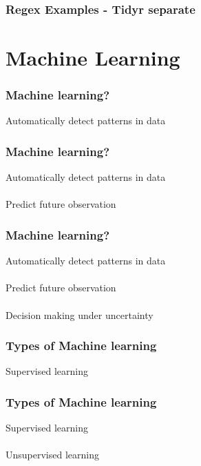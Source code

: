 \documentclass{beamer}
\begin{document}
\begin{frame}
	\frametitle{Regex Examples - Tidyr separate}
	\begin{center}
		\lstRegexIII
	\end{center}
\end{frame}

\section{Machine Learning}

\begin{frame}
	\frametitle{Machine learning?}
	\begin{center}
	Automatically detect patterns in data
	\end{center}
\end{frame}

\begin{frame}
	\frametitle{Machine learning?}
	\begin{center}
		Automatically detect patterns in data\\~\\
		Predict future observation
	\end{center}
\end{frame}

\begin{frame}
	\frametitle{Machine learning?}
	\begin{center}
		Automatically detect patterns in data\\~\\
		Predict future observation\\~\\
		Decision making under uncertainty
	\end{center}
\end{frame}

\begin{frame}
	\frametitle{Types of Machine learning}
	\begin{center}
		Supervised learning
	\end{center}
\end{frame}

\begin{frame}
	\frametitle{Types of Machine learning}
	\begin{center}
		Supervised learning\\~\\
		Unsupervised learning
	\end{center}
\end{frame}
\end{document}
